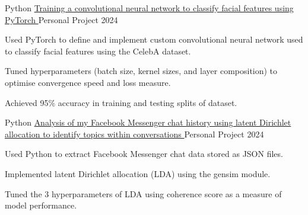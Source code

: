 

\begin{cventries}

  \cventry
    {Python}
    {\href{https://github.com/Harry2687/Face-Gender-NN}{Training a convolutional neural network to classify facial features using PyTorch \ExternalLink}}
    {Personal Project}
    {2024}
    {
      \begin{cvitems}
        \item {Used PyTorch to define and implement custom convolutional neural network used to classify facial features using the CelebA dataset.}
        \item {Tuned hyperparameters (batch size, kernel sizes, and layer composition) to optimise convergence speed and loss measure.}
        \item {Achieved 95\% accuracy in training and testing splits of dataset.}
      \end{cvitems}
    }

  \cventry
    {Python}
    {\href{https://github.com/Harry2687/Messenger-Analysis}{Analysis of my Facebook Messenger chat history using latent Dirichlet allocation to identify topics within conversations \ExternalLink}}
    {Personal Project}
    {2024}
    {
      \begin{cvitems}
        \item {Used Python to extract Facebook Messenger chat data stored as JSON files.}
        \item {Implemented latent Dirichlet allocation (LDA) using the gensim module.}
        \item {Tuned the 3 hyperparameters of LDA using coherence score as a measure of model performance.}
      \end{cvitems}
    }


\end{cventries}
